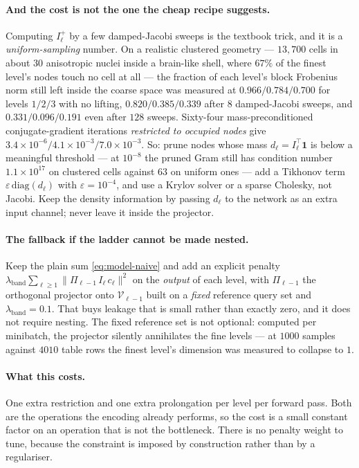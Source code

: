 \documentclass[11pt,a4paper]{article}
\newcommand{\Vs}{\mathcal{V}}
\begin{document}
\paragraph{And the cost is not the one the cheap recipe suggests.} Computing $I_\ell^{+}$ by
a few damped-Jacobi sweeps is the textbook trick, and it is a \emph{uniform-sampling} number.
On a realistic clustered geometry --- $13{,}700$ cells in about $30$ anisotropic nuclei
inside a brain-like shell, where $67\%$ of the finest level's nodes touch no cell at all ---
the fraction of each level's block Frobenius norm still left inside the coarse space was
measured at $0.966 / 0.784 / 0.700$ for levels $1/2/3$ with no lifting, $0.820 / 0.385 /
0.339$ after $8$ damped-Jacobi sweeps, and $0.331 / 0.096 / 0.191$ even after $128$ sweeps.
Sixty-four mass-preconditioned conjugate-gradient iterations \emph{restricted to occupied
nodes} give $3.4\times10^{-6} / 4.1\times10^{-3} / 7.0\times10^{-3}$. So: prune nodes whose
mass $d_\ell = I_\ell^{\!\top}\mathbf{1}$ is below a meaningful threshold --- at $10^{-8}$
the pruned Gram still has condition number $1.1\times10^{17}$ on clustered cells against
$63$ on uniform ones --- add a Tikhonov term $\varepsilon\,\mathrm{diag}(d_\ell)$ with
$\varepsilon = 10^{-4}$, and use a Krylov solver or a sparse Cholesky, not Jacobi. Keep the
density information by passing $d_\ell$ to the network as an extra input channel; never
leave it inside the projector.

\paragraph{The fallback if the ladder cannot be made nested.} Keep the plain sum
\eqref{eq:model-naive} and add an explicit penalty
$\lambda_{\mathrm{band}}\sum_{\ell\geq1}\big\|\Pi_{\ell-1}\,I_\ell\,c_\ell\big\|^2$ on the
\emph{output} of each level, with $\Pi_{\ell-1}$ the orthogonal projector onto $\Vs_{\ell-1}$
built on a \emph{fixed} reference query set and $\lambda_{\mathrm{band}} = 0.1$. That buys
leakage that is small rather than exactly zero, and it does not require nesting. The fixed
reference set is not optional: computed per minibatch, the projector silently annihilates the
fine levels --- at $1000$ samples against $4010$ table rows the finest level's dimension was
measured to collapse to $1$.

\paragraph{What this costs.} One extra restriction and one extra prolongation per level per
forward pass. Both are the operations the encoding already performs, so the cost is a small
constant factor on an operation that is not the bottleneck. There is no penalty weight to
tune, because the constraint is imposed by construction rather than by a regulariser.
\end{document}
